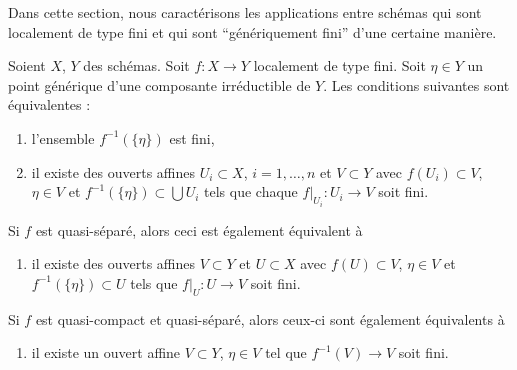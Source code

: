 \noindent
Dans cette section, nous caractérisons les applications entre schémas
qui sont localement de type fini et qui sont ``génériquement fini'' d'une
certaine manière.

\begin{lemma}
\label{lemma-generically-finite}
Soient $X$, $Y$
des schémas. Soit $f : X \to Y$ localement de type fini. Soit
$\eta \in Y$ un point générique d'une composante irréductible de $Y$.
Les conditions suivantes sont équivalentes :
\begin{enumerate}
\item l'ensemble $f^{-1}(\{\eta\})$ est fini,
\item il existe des ouverts affines $U_i \subset X$,
$i = 1, \ldots, n$ et $V \subset Y$ avec $f(U_i) \subset V$,
$\eta \in V$ et $f^{-1}(\{\eta\}) \subset \bigcup U_i$ tels
que chaque $f|_{U_i} : U_i \to V$ soit fini.
\end{enumerate}
Si $f$ est quasi-séparé, alors ceci est également équivalent à
\begin{enumerate}
\item[(3)] il existe des ouverts affines
$V \subset Y$ et $U \subset X$ avec $f(U) \subset V$,
$\eta \in V$ et $f^{-1}(\{\eta\}) \subset U$ tels
que $f|_U : U \to V$ soit fini.
\end{enumerate}
Si $f$ est quasi-compact et quasi-séparé, alors
ceux-ci sont également équivalents à
\begin{enumerate}
\item[(4)] il existe un ouvert affine $V \subset Y$, $\eta \in V$
tel que $f^{-1}(V) \to V$ soit fini.
\end{enumerate}
\end{lemma}

